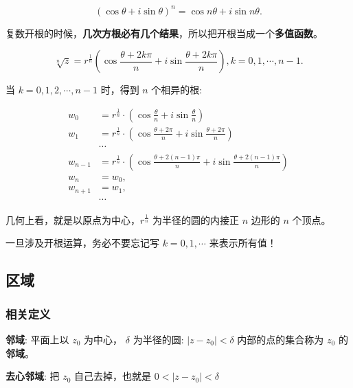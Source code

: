 \begin{equation*}
(\cos\theta+i\sin\theta)^n=\cos n\theta+i\sin n\theta.
\end{equation*}

复数开根的时候，\textbf{几次方根必有几个结果}，所以把开根当成一个\textbf{多值函数}。

\begin{equation*}
\sqrt[n]{z}=r^\frac{1}{n}\left(\cos\frac{\theta+2k\pi}{n}+i\sin\frac{\theta+2k\pi}{n} \right),k=0,1,\cdots,n-1.
\end{equation*}

当 \(k=0,1,2,\cdots,n-1\) 时，得到 \(n\) 个相异的根:

\begin{align*}
w_0 &= r^{\frac{1}{n}} \cdot \left( \cos\frac{\theta}{n} + i\sin\frac{\theta}{n} \right)\\
w_1 &= r^{\frac{1}{n}} \cdot \left( \cos\frac{\theta + 2\pi}{n} + i\sin\frac{\theta + 2\pi}{n} \right)\\
&\cdots\\
w_{n-1} &= r^{\frac{1}{n}} \cdot \left( \cos\frac{\theta + 2(n-1)\pi}{n} + i\sin\frac{\theta + 2(n-1)\pi}{n} \right)\\
w_n&=w_0,\\
w_{n+1}&=w_1,\\
&\cdots
\end{align*}

几何上看，就是以原点为中心，\(r^\frac{1}{n}\) 为半径的圆的内接正 \(n\)
边形的 \(n\) 个顶点。

\begin{tcolorbox}[title={Note},colback=red!5!white
,colframe=red!75!black
,colbacktitle=yellow!50!red
,coltitle=red!25!black, fonttitle=\bfseries,subtitle style={boxrule=0.4pt, colback=yellow!50!red!25!white}]
一旦涉及开根运算，务必不要忘记写 \(k=0,1,\cdots\) 来表示所有值！

\end{tcolorbox}
\subsection{区域}
\label{区域}
\subsubsection{相关定义}
\label{相关定义}
\textbf{邻域}: 平面上以 \(z_0\) 为中心， \(\delta\)
为半径的圆: \(|z-z_0|<\delta\) 内部的点的集合称为 \(z_0\) 的\textbf{邻域}。

\textbf{去心邻域}: 把 \(z_0\) 自己去掉，也就是 \(0 < |z-z_0| < \delta\)

